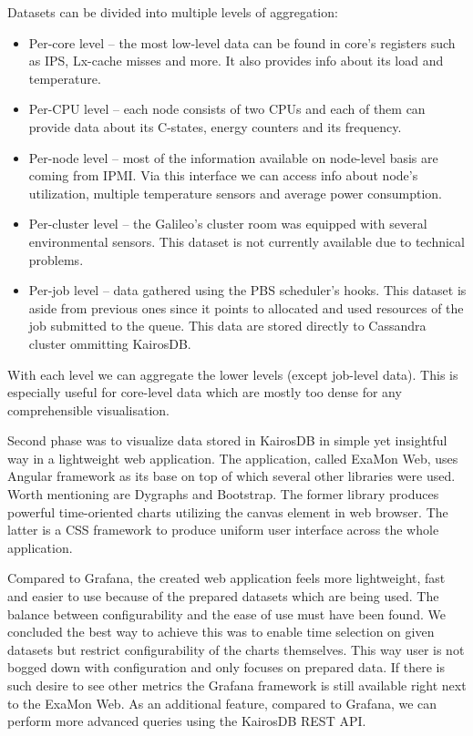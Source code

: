 \documentclass[a4paper, twoside]{article}
\begin{document}
\begin{multicols}{3}
Datasets can be divided into multiple levels of aggregation:
\begin{itemize}
    \item{Per-core level -- the most low-level data can be found in core's registers such as IPS, Lx-cache misses and more. It also provides info about its load and temperature.}
    \item{Per-CPU level -- each node consists of two CPUs and each of them can provide data about its C-states, energy counters and its frequency.}
    \item{Per-node level -- most of the information available on node-level basis are coming from IPMI\cite{ipmi}. Via this interface we can access info about node's utilization, multiple temperature sensors and average power consumption.}
    \item{Per-cluster level -- the Galileo's cluster room was equipped with several environmental sensors. This dataset is not currently available due to technical problems.}
    \item{Per-job level -- data gathered using the PBS scheduler's hooks. This dataset is aside from previous ones since it points to allocated and used resources of the job submitted to the queue. This data are stored directly to Cassandra cluster ommitting KairosDB.}
\end{itemize}

With each level we can aggregate the lower levels (except job-level data). This is especially useful for core-level data which are mostly too dense for any comprehensible visualisation.

Second phase was to visualize data stored in KairosDB in simple yet insightful way in a lightweight web application. The application, called ExaMon Web, uses Angular framework as its base on top of which several other libraries were used. Worth mentioning are Dygraphs and Bootstrap. The former library produces powerful time-oriented charts utilizing the canvas element in web browser. The latter is a CSS framework to produce uniform user interface across the whole application.

Compared to Grafana, the created web application feels more lightweight, fast and easier to use because of the prepared datasets which are being used. The balance between configurability and the ease of use must have been found. We concluded the best way to achieve this was to enable time selection on given datasets but restrict configurability of the charts themselves. This way user is not bogged down with configuration and only focuses on prepared data. If there is such desire to see other metrics the Grafana framework is still available right next to the ExaMon Web. As an additional feature, compared to Grafana, we can perform more advanced queries using the KairosDB REST API.


\end{multicols}
\end{document}
